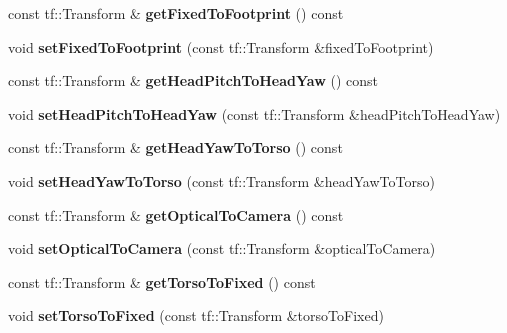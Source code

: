 \begin{DoxyCompactItemize}
\item 
\hypertarget{classCameraMeasurePoint_a940011f76fd6f61693cb4f0103318278}{const tf\-::\-Transform \& {\bfseries get\-Fixed\-To\-Footprint} () const }\label{classCameraMeasurePoint_a940011f76fd6f61693cb4f0103318278}

\item 
\hypertarget{classCameraMeasurePoint_a57a334748d902d8e4360770297599999}{void {\bfseries set\-Fixed\-To\-Footprint} (const tf\-::\-Transform \&fixed\-To\-Footprint)}\label{classCameraMeasurePoint_a57a334748d902d8e4360770297599999}

\item 
\hypertarget{classCameraMeasurePoint_a8b09fee300825cd0ea98a31ecbbf9a03}{const tf\-::\-Transform \& {\bfseries get\-Head\-Pitch\-To\-Head\-Yaw} () const }\label{classCameraMeasurePoint_a8b09fee300825cd0ea98a31ecbbf9a03}

\item 
\hypertarget{classCameraMeasurePoint_a268d759e6e173e10915b81dab304f830}{void {\bfseries set\-Head\-Pitch\-To\-Head\-Yaw} (const tf\-::\-Transform \&head\-Pitch\-To\-Head\-Yaw)}\label{classCameraMeasurePoint_a268d759e6e173e10915b81dab304f830}

\item 
\hypertarget{classCameraMeasurePoint_aa8e97a6061ee2d23d4ebd4078bf114b5}{const tf\-::\-Transform \& {\bfseries get\-Head\-Yaw\-To\-Torso} () const }\label{classCameraMeasurePoint_aa8e97a6061ee2d23d4ebd4078bf114b5}

\item 
\hypertarget{classCameraMeasurePoint_a3a13348fd95baef71d0ec49032856c2c}{void {\bfseries set\-Head\-Yaw\-To\-Torso} (const tf\-::\-Transform \&head\-Yaw\-To\-Torso)}\label{classCameraMeasurePoint_a3a13348fd95baef71d0ec49032856c2c}

\item 
\hypertarget{classCameraMeasurePoint_abf729566f8c54ae01a3d468fea94be32}{const tf\-::\-Transform \& {\bfseries get\-Optical\-To\-Camera} () const }\label{classCameraMeasurePoint_abf729566f8c54ae01a3d468fea94be32}

\item 
\hypertarget{classCameraMeasurePoint_a0652acb77f7e874dfdaad23a3652ce34}{void {\bfseries set\-Optical\-To\-Camera} (const tf\-::\-Transform \&optical\-To\-Camera)}\label{classCameraMeasurePoint_a0652acb77f7e874dfdaad23a3652ce34}

\item 
\hypertarget{classCameraMeasurePoint_a5b51d162cf7e23c684d0f36742ee6be9}{const tf\-::\-Transform \& {\bfseries get\-Torso\-To\-Fixed} () const }\label{classCameraMeasurePoint_a5b51d162cf7e23c684d0f36742ee6be9}

\item 
\hypertarget{classCameraMeasurePoint_a2a5c35e0cc027ee7ef20803fa8047e7c}{void {\bfseries set\-Torso\-To\-Fixed} (const tf\-::\-Transform \&torso\-To\-Fixed)}\label{classCameraMeasurePoint_a2a5c35e0cc027ee7ef20803fa8047e7c}

\end{DoxyCompactItemize}
